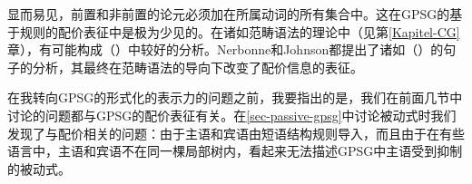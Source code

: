 \eal
{}
\zl
显而易见，前置和非前置的论元必须加在所属动词的所有集合中。这在GPSG的基于规则的配价表征中是极为少见的。在诸如范畴语法的理论中（见第\ref{Kapitel-CG}章），有可能构成（）中较好的分析\citep{Geach70a}。Nerbonne和Johnson都提出了诸如（）的句子的分析，其最终在范畴语法的导向下改变了配价信息的表征。

在我转向GPSG的形式化的表示力的问题之前，我要指出的是，我们在前面几节中讨论的问题都与GPSG的配价表征有关。在\ref{sec-passive-gpsg}中讨论被动式时我们发现了与配价相关的问题：由于主语和宾语由短语结构规则导入，而且由于在有些语言中，主语和宾语不在同一棵局部树内，看起来无法描述GPSG中主语受到抑制的被动式。


